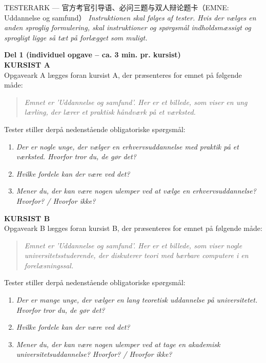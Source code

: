 \begin{emailbox}{TESTERARK --- 官方考官引导语、必问三题与双人辩论题卡（EMNE: Uddannelse og samfund）}
\small\textcolor{NCDGray}{\textit{Instruktionen skal følges af tester. Hvis der vælges en anden sproglig formulering, skal instruktioner og spørgsmål indholdsmæssigt og sprogligt ligge så tæt på forlægget som muligt.}}

\vspace{0.35em}
\textbf{\color{NCDRed}Del 1 (individuel opgave -- ca. 3 min. pr. kursist)}\\
\textbf{\color{NCDNavy}KURSIST A}\\
Opgaveark A lægges foran kursist A, der præsenteres for emnet på følgende måde:
\begin{quote}
\textit{Emnet er 'Uddannelse og samfund'. Her er et billede, som viser en ung lærling, der lærer et praktisk håndværk på et værksted.}
\end{quote}
Tester stiller derpå nedenstående obligatoriske spørgsmål:
\begin{enumerate}
  \item \textit{Der er nogle unge, der vælger en erhvervsuddannelse med praktik på et værksted. Hvorfor tror du, de gør det?}
  \item \textit{Hvilke fordele kan der være ved det?}
  \item \textit{Mener du, der kan være nogen ulemper ved at vælge en erhvervsuddannelse? Hvorfor? / Hvorfor ikke?}
\end{enumerate}

\textbf{\color{NCDNavy}KURSIST B}\\
Opgaveark B lægges foran kursist B, der præsenteres for emnet på følgende måde:
\begin{quote}
\textit{Emnet er 'Uddannelse og samfund'. Her er et billede, som viser nogle universitetsstuderende, der diskuterer teori med bærbare computere i en forelæsningssal.}
\end{quote}
Tester stiller derpå nedenstående obligatoriske spørgsmål:
\begin{enumerate}
  \item \textit{Der er mange unge, der vælger en lang teoretisk uddannelse på universitetet. Hvorfor tror du, de gør det?}
  \item \textit{Hvilke fordele kan der være ved det?}
  \item \textit{Mener du, der kan være nogen ulemper ved at tage en akademisk universitetsuddannelse? Hvorfor? / Hvorfor ikke?}
\end{enumerate}


\end{emailbox}
